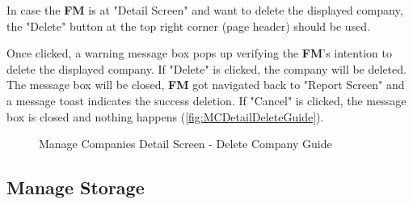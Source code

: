 \bigskip
In case the \textbf{FM} is at "Detail Screen" and want to delete the displayed company, the "Delete" button at the top right corner (page header) should be used. 

Once clicked, a warning message box pops up verifying the \textbf{FM}'s intention to delete the displayed company. If "Delete" is clicked, the company will be deleted. The message box will be closed, \textbf{FM} got navigated back to "Report Screen" and a message toast indicates the success deletion. If "Cancel" is clicked, the message box is closed and nothing happens (\autoref{fig:MCDetailDeleteGuide}).

\begin{figure}[H]
	\centering
    \vspace{10pt}
    \caption{Manage Companies Detail Screen - Delete Company Guide}
	\label{fig:MCDetailDeleteGuide}
\end{figure}



\subsection{Manage Storage}
\label{subsec:ms}

